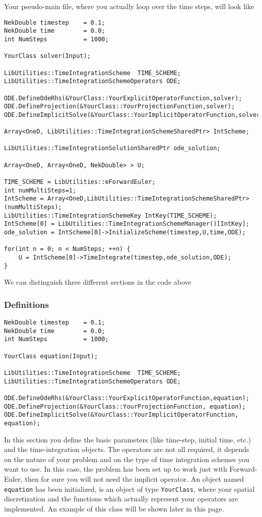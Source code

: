 Your pseudo-main file, where you actually loop over the time steps, will look
like
\begin{lstlisting}[style=C++Style]
NekDouble timestep    = 0.1; 
NekDouble time        = 0.0; 
int NumSteps          = 1000;

YourClass solver(Input);
    
LibUtilities::TimeIntegrationScheme  TIME_SCHEME;
LibUtilities::TimeIntegrationSchemeOperators ODE;

ODE.DefineOdeRhs(&YourClass::YourExplicitOperatorFunction,solver);
ODE.DefineProjection(&YourClass::YourProjectionFunction,solver);
ODE.DefineImplicitSolve(&YourClass::YourImplicitOperatorFunction,solver);
    
Array<OneD, LibUtilities::TimeIntegrationSchemeSharedPtr> IntScheme;
    
LibUtilities::TimeIntegrationSolutionSharedPtr ode_solution;
    
Array<OneD, Array<OneD, NekDouble> > U;

TIME_SCHEME = LibUtilities::eForwardEuler; 
int numMultiSteps=1; 
IntScheme = Array<OneD,LibUtilities::TimeIntegrationSchemeSharedPtr>(numMultiSteps); 
LibUtilities::TimeIntegrationSchemeKey IntKey(TIME_SCHEME); 
IntScheme[0] = LibUtilities::TimeIntegrationSchemeManager()[IntKey]; 
ode_solution = IntScheme[0]->InitializeScheme(timestep,U,time,ODE);

for(int n = 0; n < NumSteps; ++n) {
    U = IntScheme[0]->TimeIntegrate(timestep,ode_solution,ODE);
}
\end{lstlisting}

We can distinguish three different sections in the code above

\subsubsection{Definitions} 
\begin{lstlisting}[style=C++Style]
NekDouble timestep    = 0.1; 
NekDouble time        = 0.0;
int NumSteps          = 1000;

YourClass equation(Input);
    
LibUtilities::TimeIntegrationScheme  TIME_SCHEME;
LibUtilities::TimeIntegrationSchemeOperators ODE;

ODE.DefineOdeRhs(&YourClass::YourExplicitOperatorFunction,equation);
ODE.DefineProjection(&YourClass::YourProjectionFunction, equation);
ODE.DefineImplicitSolve(&YourClass::YourImplicitOperatorFunction, equation);
\end{lstlisting}
In this section you define the basic parameters (like time-step, initial time,
etc.) and the time-integration objects.
The operators are not all required, it depends on the nature of your problem and
on the type of time integration schemes you want to use. In this case, the
problem has been set up to work just with Forward-Euler, then for sure you will
not need the implicit operator.
An object named \texttt{equation} has been initialized, is an object of type
\texttt{YourClass}, where your spatial discretization and the functions which
actually represent your operators are implemented. An example of this class will
be shown later in this page.


